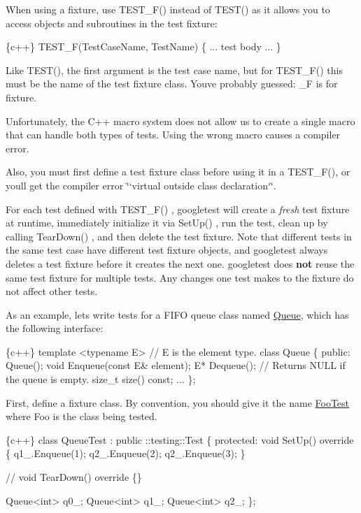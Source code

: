 When using a fixture, use {\ttfamily T\+E\+S\+T\+\_\+\+F()} instead of {\ttfamily T\+E\+S\+T()} as it allows you to access objects and subroutines in the test fixture\+:


\begin{DoxyCode}
\{c++\}
TEST\_F(TestCaseName, TestName) \{
  ... test body ...
\}
\end{DoxyCode}


Like {\ttfamily T\+E\+S\+T()}, the first argument is the test case name, but for {\ttfamily T\+E\+S\+T\+\_\+\+F()} this must be the name of the test fixture class. You\textquotesingle{}ve probably guessed\+: {\ttfamily \+\_\+F} is for fixture.

Unfortunately, the C++ macro system does not allow us to create a single macro that can handle both types of tests. Using the wrong macro causes a compiler error.

Also, you must first define a test fixture class before using it in a {\ttfamily T\+E\+S\+T\+\_\+\+F()}, or you\textquotesingle{}ll get the compiler error \char`\"{}`virtual outside class
declaration`\char`\"{}.

For each test defined with {\ttfamily T\+E\+S\+T\+\_\+\+F()} , googletest will create a {\itshape fresh} test fixture at runtime, immediately initialize it via {\ttfamily Set\+Up()} , run the test, clean up by calling {\ttfamily Tear\+Down()} , and then delete the test fixture. Note that different tests in the same test case have different test fixture objects, and googletest always deletes a test fixture before it creates the next one. googletest does {\bfseries not} reuse the same test fixture for multiple tests. Any changes one test makes to the fixture do not affect other tests.

As an example, let\textquotesingle{}s write tests for a F\+I\+FO queue class named {\ttfamily \hyperlink{classQueue}{Queue}}, which has the following interface\+:


\begin{DoxyCode}
\{c++\}
template <typename E>  // E is the element type.
class Queue \{
 public:
  Queue();
  void Enqueue(const E& element);
  E* Dequeue();  // Returns NULL if the queue is empty.
  size\_t size() const;
  ...
\};
\end{DoxyCode}


First, define a fixture class. By convention, you should give it the name {\ttfamily \hyperlink{classFooTest}{Foo\+Test}} where {\ttfamily Foo} is the class being tested.


\begin{DoxyCode}
\{c++\}
class QueueTest : public ::testing::Test \{
 protected:
  void SetUp() override \{
     q1\_.Enqueue(1);
     q2\_.Enqueue(2);
     q2\_.Enqueue(3);
  \}

  // void TearDown() override \{\}

  Queue<int> q0\_;
  Queue<int> q1\_;
  Queue<int> q2\_;
\};
\end{DoxyCode}


